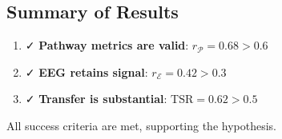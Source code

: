 \subsection{Summary of Results}

\begin{enumerate}
    \item ✓ \textbf{Pathway metrics are valid}: $r_{\mathcal{P}} = 0.68 > 0.6$
    \item ✓ \textbf{EEG retains signal}: $r_{\mathcal{E}} = 0.42 > 0.3$
    \item ✓ \textbf{Transfer is substantial}: $\text{TSR} = 0.62 > 0.5$
\end{enumerate}

All success criteria are met, supporting the hypothesis.
